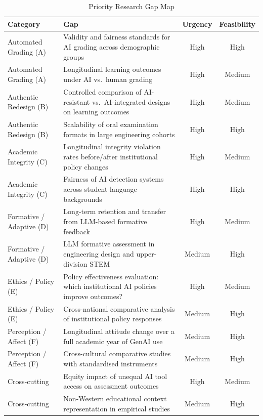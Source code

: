 \documentclass[conference]{IEEEtran}
\begin{document}
\begin{table}[ht]
\caption{Priority Research Gap Map}
\label{tab:gaps}
\centering
\begin{tabular}{p{2.4cm}p{8.2cm}cc}
\toprule
\textbf{Category} & \textbf{Gap} & \textbf{Urgency} & \textbf{Feasibility} \\
\midrule
Automated Grading (A)
  & Validity and fairness standards for AI grading across demographic groups
  & High & High \\
Automated Grading (A)
  & Longitudinal learning outcomes under AI vs.\ human grading
  & High & Medium \\
Authentic Redesign (B)
  & Controlled comparison of AI-resistant vs.\ AI-integrated designs on learning outcomes
  & High & Medium \\
Authentic Redesign (B)
  & Scalability of oral examination formats in large engineering cohorts
  & High & High \\
Academic Integrity (C)
  & Longitudinal integrity violation rates before/after institutional policy changes
  & High & Medium \\
Academic Integrity (C)
  & Fairness of AI detection systems across student language backgrounds
  & High & High \\
Formative / Adaptive (D)
  & Long-term retention and transfer from LLM-based formative feedback
  & High & Medium \\
Formative / Adaptive (D)
  & LLM formative assessment in engineering design and upper-division STEM
  & Medium & High \\
Ethics / Policy (E)
  & Policy effectiveness evaluation: which institutional AI policies improve outcomes?
  & High & Medium \\
Ethics / Policy (E)
  & Cross-national comparative analysis of institutional policy responses
  & Medium & High \\
Perception / Affect (F)
  & Longitudinal attitude change over a full academic year of GenAI use
  & Medium & High \\
Perception / Affect (F)
  & Cross-cultural comparative studies with standardised instruments
  & Medium & High \\
Cross-cutting
  & Equity impact of unequal AI tool access on assessment outcomes
  & High & Medium \\
Cross-cutting
  & Non-Western educational context representation in empirical studies
  & Medium & High \\
\bottomrule
\end{tabular}
\end{table}
\end{document}
